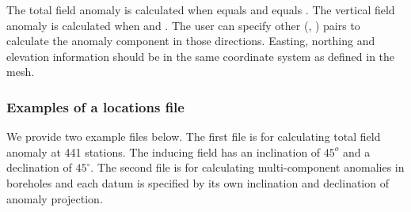 %
The total field anomaly is calculated when  equals  and  equals . The vertical field anomaly is calculated when  and . The user can specify other (, ) pairs to calculate the anomaly component in those directions. Easting, northing and elevation information should be in the same coordinate system as defined in the mesh.

\subsubsection*{Examples of a locations file}

We provide two example files below. The first file is for calculating total field anomaly at 441 stations. The inducing field has an inclination of $45^o$ and a declination of $45^\circ$. The second file is for calculating multi-component anomalies in boreholes and each datum is specified by its own inclination and declination of anomaly projection.

